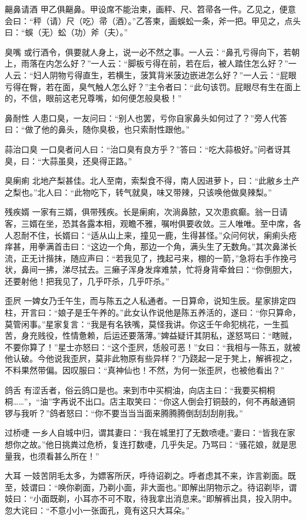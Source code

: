 \documentclass[12pt,UTF8]{ctexbook}
\begin{document}
齆鼻请酒
甲乙俱齆鼻。甲设席不能治柬，画秤、尺、笤帚各一件。乙见之，便意会曰：“秤（请）尺（吃）帚（酒）。”乙答柬，画蜈蚣一条，斧一把。甲见之，点头曰：“蜈（无）蚣（功）斧（夫）。”

臭嘴
或行酒令，俱要就人身上，说一必不然之事。一人云：“鼻孔亏得向下，若朝上，雨落在内怎么好？”一人云：“脚板亏得在前，若在后，被人踏住怎么好？”一人云：“妇人阴物亏得直生，若横生，菠箕背米菠边嵌进怎么好？”一人云：“屁眼亏得在臀，若在面，臭气触人怎么好？”主令者曰：“此句该罚。屁眼尽有生在面上的，不信，眼前这老兄尊嘴，如何便怎般臭极！”

鼻耐性
人患口臭，一友问曰：“别人也罢，亏你自家鼻头如何过了？”旁人代答曰：“做了他的鼻头，随你臭极，也只索耐性跟他。”

蒜治口臭
一口臭者问人曰：“治口臭有良方乎？”答曰：“吃大蒜极好。”问者讶其臭，曰：“大蒜虽臭，还臭得正路。”

臭瘌痢
北地产梨甚佳。北人至南，索梨食不得，南人因进萝卜，曰：“此敝乡土产之梨也。”北人曰：“此物吃下，转气就臭，味又带辣，只该唤他做臭辣梨。”

残疾婿
一家有三婿，俱带残疾。长是瘌痢，次淌鼻脓，又次患疯癫。翁一日请客，三婿在坐，恐其各露本相，观瞻不雅，嘱咐俱要收敛。三人唯唯。至中席，各人忍耐不住，长婿曰：“适从山上来，撞见一鹿，生得甚怪。”众问何状，瘌痢头疮痒甚，用拳满首击曰：“这边一个角，那边一个角，满头生了无数角。”其次鼻涕长流，正无计揩抹，随应声曰：“若我见了，拽起弓来，棚的一箭，”急将右手作挽弓状，鼻间一拂，涕尽拭去。三癞子浑身发痒难禁，忙将身背牵耸曰：“你倒胆大，还要射他！把我见了，几乎吓杀，几乎吓杀。”

歪屄
一婢女乃壬午生，而与陈五之人私通者。一日算命，说知生辰。星家排定四柱，开言曰：“娘子是壬午养的。”此女认作说他是陈五养活的，遂曰：“你只算命，莫管闲事。”星家复言：“我是有名铁嘴，莫怪我讲。你这壬午命犯桃花，一生孤苦，身充贱役，性情惫赖，后运还要落薄。”婢益疑讦其阴私，遂怒骂曰：“瞎贼，不要你算了！”星士亦怒曰：“这个歪屄，恁般可恶！”女曰：“我相与一陈五，就被他认破。今他说我歪屄，莫非此物原有些异样？”乃跷起一足于凳上，解裤视之，不料果然带偏。因叹服曰：“真神仙也！不然，为何一张歪屄，也被他看出？”

鸽舌
有涩舌者，俗云鸽口是也。来到市中买桐油，向店主曰：“我要买桐桐桐……”，“油”字再说不出口。店主取笑曰：“你这人倒会打铜鼓的，何不再敲通铜锣与我听？”鸽者怒曰：“你不要当当当面来腾腾腾倒刮刮刮削我。”

过桥啑
一乡人自城中归，谓其妻曰：“我在城里打了无数喷啑。”妻曰：“皆我在家想你之故。”他日挑粪过危桥，复连打数啑，几乎失足。乃骂曰：“骚花娘，就是思量我，也须看甚么所在！”

大耳
一妓苦阴毛太多，为嫖客所厌，呼待诏剃之。呼者虑其不来，诈言剃面。既至，妓谓曰：“唤你剃面，乃剃小面，非大面也。”即解出阴物示之。待诏剃毕，谓妓曰：“小面既剃，小耳亦不可不取，待我拿出消息来。”即解裤出具，投入阴中。忽大诧曰：“不意小小一张面孔，竟有这只大耳朵。”
\end{document}
